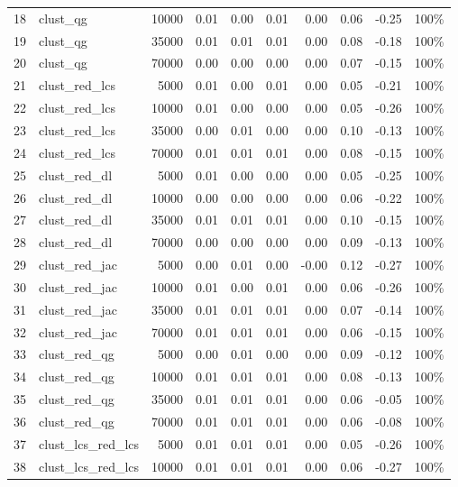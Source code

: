 \documentclass{praca1}
\begin{document}
\begin{table}[!h]
\begin{tabular}{|rlr|rrr|rr|r|r|}
  18 & clust\_qg & 10000 & 0.01 & 0.00 & 0.01 & 0.00 & 0.06 & -0.25 & 100\% \\ 
  19 & clust\_qg & 35000 & 0.01 & 0.01 & 0.01 & 0.00 & 0.08 & -0.18 & 100\% \\ 
  20 & clust\_qg & 70000 & 0.00 & 0.00 & 0.00 & 0.00 & 0.07 & -0.15 & 100\% \\ 
   \hline
21 & clust\_red\_lcs & 5000 & 0.01 & 0.00 & 0.01 & 0.00 & 0.05 & -0.21 & 100\% \\ 
  22 & clust\_red\_lcs & 10000 & 0.01 & 0.00 & 0.00 & 0.00 & 0.05 & -0.26 & 100\% \\ 
  23 & clust\_red\_lcs & 35000 & 0.00 & 0.01 & 0.00 & 0.00 & 0.10 & -0.13 & 100\% \\ 
  24 & clust\_red\_lcs & 70000 & 0.01 & 0.01 & 0.01 & 0.00 & 0.08 & -0.15 & 100\% \\ 
   \hline
25 & clust\_red\_dl & 5000 & 0.01 & 0.00 & 0.00 & 0.00 & 0.05 & -0.25 & 100\% \\ 
  26 & clust\_red\_dl & 10000 & 0.00 & 0.00 & 0.00 & 0.00 & 0.06 & -0.22 & 100\% \\ 
  27 & clust\_red\_dl & 35000 & 0.01 & 0.01 & 0.01 & 0.00 & 0.10 & -0.15 & 100\% \\ 
  28 & clust\_red\_dl & 70000 & 0.00 & 0.00 & 0.00 & 0.00 & 0.09 & -0.13 & 100\% \\ 
   \hline
29 & clust\_red\_jac & 5000 & 0.00 & 0.01 & 0.00 & -0.00 & 0.12 & -0.27 & 100\% \\ 
  30 & clust\_red\_jac & 10000 & 0.01 & 0.00 & 0.01 & 0.00 & 0.06 & -0.26 & 100\% \\ 
  31 & clust\_red\_jac & 35000 & 0.01 & 0.01 & 0.01 & 0.00 & 0.07 & -0.14 & 100\% \\ 
  32 & clust\_red\_jac & 70000 & 0.01 & 0.01 & 0.01 & 0.00 & 0.06 & -0.15 & 100\% \\ 
   \hline
33 & clust\_red\_qg & 5000 & 0.00 & 0.01 & 0.00 & 0.00 & 0.09 & -0.12 & 100\% \\ 
  34 & clust\_red\_qg & 10000 & 0.01 & 0.01 & 0.01 & 0.00 & 0.08 & -0.13 & 100\% \\ 
  35 & clust\_red\_qg & 35000 & 0.01 & 0.01 & 0.01 & 0.00 & 0.06 & -0.05 & 100\% \\ 
  36 & clust\_red\_qg & 70000 & 0.01 & 0.01 & 0.01 & 0.00 & 0.06 & -0.08 & 100\% \\ 
   \hline
37 & clust\_lcs\_red\_lcs & 5000 & 0.01 & 0.01 & 0.01 & 0.00 & 0.05 & -0.26 & 100\% \\ 
  38 & clust\_lcs\_red\_lcs & 10000 & 0.01 & 0.01 & 0.01 & 0.00 & 0.06 & -0.27 & 100\% \\ 

\end{tabular}
\end{table}
\end{document}
